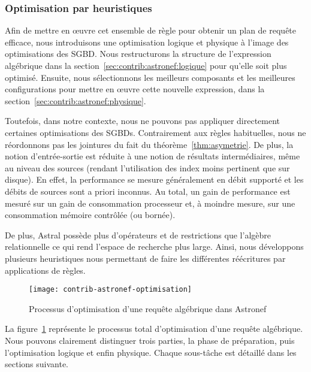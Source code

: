 \subsubsection{Optimisation par heuristiques}
Afin de mettre en œuvre cet ensemble de règle pour obtenir un plan de requête efficace, nous introduisons une optimisation logique et physique à l'image des optimisations des SGBD. Nous restructurons la structure de l'expression algébrique dans la section~\ref{sec:contrib:astronef:logique} pour qu'elle soit plus optimisé. Ensuite, nous sélectionnons les meilleurs composants et les meilleures configurations pour mettre en œuvre cette nouvelle expression, dans la section~\ref{sec:contrib:astronef:physique}.

Toutefois, dans notre contexte, nous ne pouvons pas appliquer directement certaines optimisations des SGBDs. Contrairement aux règles habituelles, nous ne réordonnons pas les jointures du fait du théorème~\ref{thm:asymetrie}. De plus, la notion d'entrée-sortie est réduite à une notion de résultats intermédiaires, même au niveau des sources (rendant l'utilisation des index moins pertinent que sur disque). En effet, la performance se mesure généralement en débit supporté et les débits de sources sont a priori inconnus. Au total, un gain de performance est mesuré sur un gain de consommation processeur et, à moindre mesure, sur une consommation mémoire contrôlée (ou bornée).

De plus, Astral possède plus d'opérateurs et de restrictions que l'algèbre relationnelle ce qui rend l'espace de recherche plus large. Ainsi, nous développons plusieurs heuristiques nous permettant de faire les différentes réécritures par applications de règles.

\begin{figure}[ht]
	\centering
	\texttt{[image: contrib-astronef-optimisation]}
	\caption{Processus d'optimisation d'une requête algébrique dans Astronef}\label{fig:contrib:astronef:optimisation}
\end{figure}
La figure~\ref{fig:contrib:astronef:optimisation} représente le processus total d'optimisation d'une requête algébrique. Nous pouvons clairement distinguer trois parties, la phase de préparation, puis l'optimisation logique et enfin physique. Chaque sous-tâche est détaillé dans les sections suivante.

